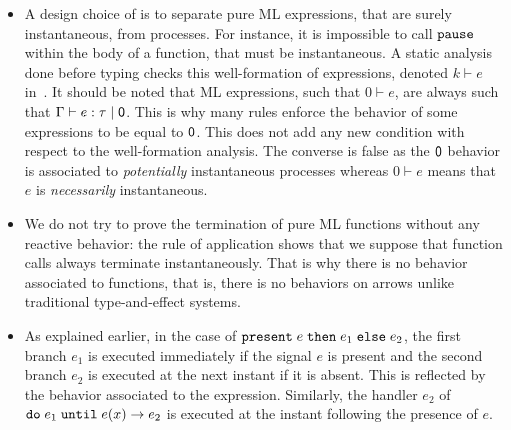 \documentclass[9pt,preprint]{sigplanconf}
\begin{document}
\begin{itemize}

\item A design choice of \rml{} is to separate pure ML expressions, that are surely instantaneous, from processes. For instance, it is impossible to call $\mathtt{pause}\;$ within the body of a function, that must be instantaneous. A static analysis done before typing checks this well-formation of expressions, denoted $k \vdash e$ in~\cite{Mandel:2005}. It should be noted that ML expressions, such that $0 \vdash e$, are always such that $\Gamma \vdash e : \tau \mid \textsf{0}$. This is why many rules enforce the behavior of some expressions to be equal to $\textsf{0}$. This does not add any new condition with respect to the well-formation analysis. The converse is false as the $\textsf{0}$ behavior is associated to \emph{potentially} instantaneous processes whereas $0 \vdash e$ means that $e$ is \emph{necessarily} instantaneous.

\item We do not try to prove the termination of pure ML functions without any reactive behavior: the rule of application shows that we suppose that function calls always terminate instantaneously. That is why there is no behavior associated to functions, that is, there is no behaviors on arrows unlike traditional type-and-effect systems.

\item As explained earlier, in the case of $\mathtt{present}\; e \;\mathtt{then}\; e_1 \;\mathtt{else}\; e_2$, the first branch $e_1$ is executed immediately if the signal $e$ is present and the second branch $e_2$ is executed at the next instant if it is absent. This is reflected by the behavior associated to the expression. Similarly, the handler $e_2$ of $\mathtt{do}\; e_1 \;\mathtt{until}\; e(x) \rightarrow e_2$ is executed at the instant following the presence of $e$.


\end{itemize}
\end{document}

